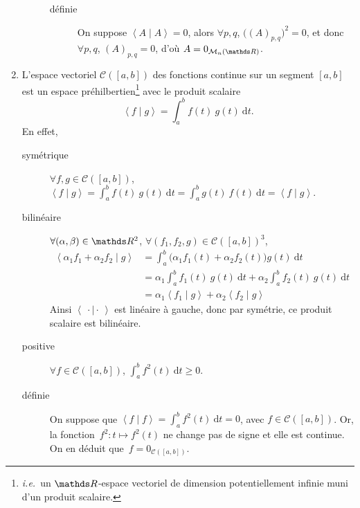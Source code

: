 \begin{exm}
\begin{enumerate}
\begin{description}
\begin{description}
						\item[définie] On suppose $\left<A  \mid A \right> = 0$, alors $\forall p,q$, $\big((A)_{p,q}\big)^2 = 0$, et donc $\forall p,q$, $(A)_{p,q} = 0$, d'où $A = 0_{\mathcal{M}_n(\R)}$.
					\end{description}
			\end{description}
		\item L'espace vectoriel $\mathcal{C}([a,b])$\/ des fonctions continue sur un segment $[a,b]$\/ est un espace préhilbertien\footnote{\textit{i.e.}\ un $\R$-espace vectoriel de dimension potentiellement infinie muni d'un produit scalaire.} avec le produit scalaire \[
				\left<f  \mid g \right> = \int_{a}^{b} f(t)\:g(t)~\mathrm{d}t
			.\]
			En effet,
			\begin{description}
				\item[symétrique] $\forall f,g \in \mathcal{C}([a,b])$, $\left<f \mid g \right> = \int_{a}^{b} f(t)\:g(t)~\mathrm{d}t = \int_{a}^{b} g(t)\:f(t)~\mathrm{d}t = \left< f  \mid g\right>$.
				\item[bilinéaire] $\forall (\alpha, \beta) \in \R^2$, $\forall (f_1,f_2,g) \in \mathcal{C}([a,b])^3$,
					\begin{align*}
						\left<\alpha_1 f_1 + \alpha_2 f_2  \mid g \right> &= \int_{a}^{b} \big(\alpha_1 f_1(t) + \alpha_2f_2(t)\big) g(t)~\mathrm{d}t\\
						&= \alpha_1 \int_{a}^{b} f_1(t)\:g(t)~\mathrm{d}t + \alpha_2 \int_{a}^{b} f_2(t)\:g(t)~\mathrm{d}t\\
						&= \alpha_1 \left<f_1 \mid g \right> + \alpha_2 \left<f_2  \mid g \right>
					\end{align*}
					Ainsi $\left<\:\cdot \mid \cdot \: \right>$ est linéaire à gauche, donc par symétrie, ce produit scalaire est bilinéaire.
				\item[positive] $\forall f \in \mathcal{C}([a,b])$, $\int_{a}^{b} f^2(t)~\mathrm{d}t \ge 0$.
				\item[définie] On suppose que $\left< f \mid f\right> = \int_{a}^{b} f^2(t)~\mathrm{d}t = 0$, avec $f \in \mathcal{C}([a,b])$. Or, la fonction~$f^2 : t \mapsto f^2(t)$\/ ne change pas de signe et elle est continue. On en déduit que~$f = 0_{\mathcal{C}([a,b])}$.
			\end{description}
	\end{enumerate}
\end{exm}

